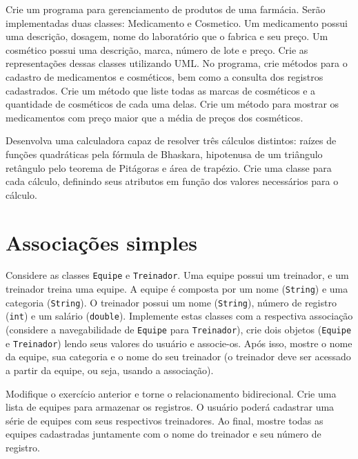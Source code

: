 \begin{exercise}[Farmacia]
	Crie um programa para gerenciamento de produtos de uma farmácia. Serão implementadas duas classes: Medicamento e Cosmetico. Um medicamento possui uma descrição, dosagem, nome do laboratório que o fabrica e seu preço. Um cosmético possui uma descrição, marca, número de lote e preço. Crie as representações dessas classes utilizando UML. No programa, crie métodos para o cadastro de medicamentos e cosméticos, bem como a consulta dos registros cadastrados. Crie um método que liste todas as marcas de cosméticos e a quantidade de cosméticos de cada uma delas. Crie um método para mostrar os medicamentos com preço maior que a média de preços dos cosméticos.
\end{exercise}

\begin{exercise}[Calculadora]
	Desenvolva uma calculadora capaz de resolver três cálculos distintos: raízes de funções quadráticas pela fórmula de Bhaskara, hipotenusa de um triângulo retângulo pelo teorema de Pitágoras e área de trapézio. Crie uma classe para cada cálculo, definindo seus atributos em função dos valores necessários para o cálculo.
\end{exercise}

\clearpage

\section{Associações simples}

\begin{exercise}[EquipeTreinador]
Considere as classes \texttt{Equipe} e \texttt{Treinador}. Uma equipe possui um treinador, e um treinador treina uma equipe. A equipe é composta por um nome (\texttt{String}) e uma categoria (\texttt{String}). O treinador possui um nome (\texttt{String}), número de registro (\texttt{int}) e um salário (\texttt{double}). Implemente estas classes com a respectiva associação (considere a navegabilidade de \texttt{Equipe} para \texttt{Treinador}), crie dois objetos (\texttt{Equipe} e \texttt{Treinador}) lendo seus valores do usuário e associe-os. Após isso, mostre o nome da equipe, sua categoria e o nome do seu treinador (o treinador deve ser acessado a partir da equipe, ou seja, usando a associação).
\end{exercise}

\begin{exercise}[ListaEquipes]
Modifique o exercício anterior e torne o relacionamento bidirecional. Crie uma lista de equipes para armazenar os registros. O usuário poderá cadastrar uma série de equipes com seus respectivos treinadores. Ao final, mostre todas as equipes cadastradas juntamente com o nome do treinador e seu número de registro.
\end{exercise}

